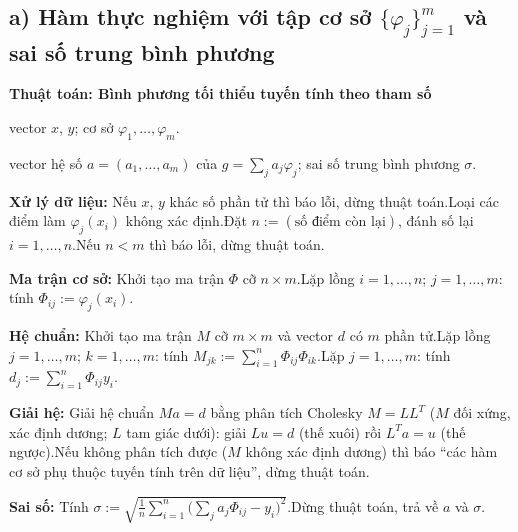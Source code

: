 \documentclass[11pt,a4paper]{article}
\newenvironment{thuattoan}[1]
  {\par\medskip\noindent\textbf{Thuật toán: #1}\begin{description}[style=standard,align=left,leftmargin=4.3em,labelwidth=3.9em,labelsep=0.4em,itemsep=1pt,topsep=3pt,font=\normalfont\bfseries]}
  {\end{description}}
\begin{document}
\subsection{a) Hàm thực nghiệm với tập cơ sở $\{\varphi_j\}_{j=1}^m$ và sai số trung bình phương}
\begin{thuattoan}{Bình phương tối thiểu tuyến tính theo tham số}
\item[Input:] vector $x$, $y$; cơ sở $\varphi_1,\dots,\varphi_m$.
\item[Output:] vector hệ số $a=(a_1,\dots,a_m)$ của $g=\sum_ja_j\varphi_j$; sai số trung bình phương $\sigma$.
\item[Bước 0:] \textbf{Xử lý dữ liệu:} Nếu $x$, $y$ khác số phần tử thì báo lỗi, dừng thuật toán.\newline Loại các điểm làm $\varphi_j(x_i)$ không xác định.\newline Đặt $n:=(\text{số điểm còn lại})$, đánh số lại $i=1,\dots,n$.\newline Nếu $n<m$ thì báo lỗi, dừng thuật toán.
\item[Bước 1:] \textbf{Ma trận cơ sở:} Khởi tạo ma trận $\Phi$ cỡ $n\times m$.\newline Lặp lồng $i=1,\dots,n$; $j=1,\dots,m$: tính $\Phi_{ij}:=\varphi_j(x_i)$.
\item[Bước 2:] \textbf{Hệ chuẩn:} Khởi tạo ma trận $M$ cỡ $m\times m$ và vector $d$ có $m$ phần tử.\newline Lặp lồng $j=1,\dots,m$; $k=1,\dots,m$: tính $M_{jk}:=\sum_{i=1}^n\Phi_{ij}\Phi_{ik}$.\newline Lặp $j=1,\dots,m$: tính $d_j:=\sum_{i=1}^n\Phi_{ij}y_i$.
\item[Bước 3:] \textbf{Giải hệ:} Giải hệ chuẩn $Ma=d$ bằng phân tích Cholesky $M=LL^{T}$ ($M$ đối xứng, xác định dương; $L$ tam giác dưới): giải $Lu=d$ (thế xuôi) rồi $L^{T}a=u$ (thế ngược).\newline Nếu không phân tích được ($M$ không xác định dương) thì báo ``các hàm cơ sở phụ thuộc tuyến tính trên dữ liệu'', dừng thuật toán.
\item[Bước 4:] \textbf{Sai số:} Tính $\sigma:=\sqrt{\frac1n\sum_{i=1}^n\big(\sum_ja_j\Phi_{ij}-y_i\big)^2}$.\newline Dừng thuật toán, trả về $a$ và $\sigma$.
\end{thuattoan}
\end{document}
